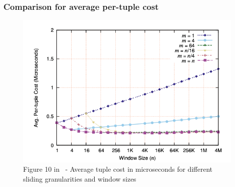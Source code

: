 \subsubsection{Comparison for average per-tuple cost}



\begin{figure}[H]
	\centering
	\includegraphics[width=\linewidth]{../figures/fig10}
	\caption{Figure 10 in~\cite{GeneralIncremental15} -  Average tuple cost in microseconds for different sliding granularities and window sizes}
	\label{fig:original_architecture}
\end{figure}

